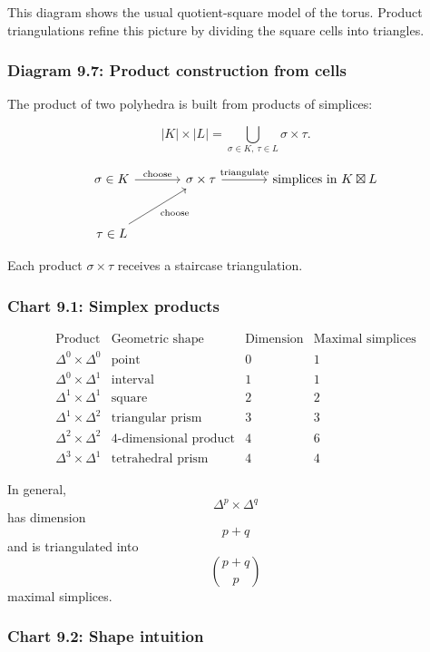 \documentclass[12pt,a4paper]{article}
\theoremstyle{notespace}
\begin{document}
This diagram shows the usual quotient-square model of the torus. Product triangulations refine this picture by dividing the square cells into triangles.

\subsubsection{Diagram 9.7: Product construction from cells}

The product of two polyhedra is built from products of simplices:

\[
|K|\times |L|
=
\bigcup_{\sigma\in K,\ \tau\in L}
\sigma\times\tau.
\]

\[
\begin{tikzcd}[column sep=large,row sep=large]
	\sigma\in K
	\arrow[r, "\text{choose}"]
	&
	\sigma\times\tau
	\arrow[r, "\text{triangulate}"]
	&
	\text{simplices in }K\boxtimes L
	\\
	\tau\in L
	\arrow[ur, "\text{choose}"']
	&
	&
\end{tikzcd}
\]

Each product \(\sigma\times\tau\) receives a staircase triangulation.

\subsubsection{Chart 9.1: Simplex products}

\[
\begin{array}{c|c|c|c}
	\text{Product} & \text{Geometric shape} & \text{Dimension} & \text{Maximal simplices} \\
	\hline
	\Delta^0\times\Delta^0
	& \text{point}
	& 0
	& 1
	\\
	\hline
	\Delta^0\times\Delta^1
	& \text{interval}
	& 1
	& 1
	\\
	\hline
	\Delta^1\times\Delta^1
	& \text{square}
	& 2
	& 2
	\\
	\hline
	\Delta^1\times\Delta^2
	& \text{triangular prism}
	& 3
	& 3
	\\
	\hline
	\Delta^2\times\Delta^2
	& \text{4-dimensional product}
	& 4
	& 6
	\\
	\hline
	\Delta^3\times\Delta^1
	& \text{tetrahedral prism}
	& 4
	& 4
\end{array}
\]

In general,
\[
\Delta^p\times\Delta^q
\]
has dimension
\[
p+q
\]
and is triangulated into
\[
\binom{p+q}{p}
\]
maximal simplices.

\subsubsection{Chart 9.2: Shape intuition}
\end{document}
